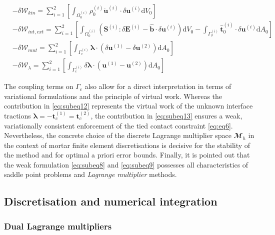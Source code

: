\documentclass[a4paper,10pt]{article} %
\begin{document}
\begin{subequations}\label{eq:constributions}
    \begin{align}
        & -\delta \mathcal{W}_{kin} = \sum_{i = 1}^2 \left[\int_{\Omega_0^{(i)}} \rho_0^{(i)} \ddot{\mathbf{u}}^{(i)} \cdot \delta \mathbf{u}^{(i)} \text{d}V_0\right] \label{eq:subeq10} \\
        & -\delta \mathcal{W}_{int,ext} = \sum_{i = 1}^2 \left[\int_{\Omega_0^{(i)}} \left(\mathbf{S}^{(i)} : \delta \mathbf{E}^{(i)} - \hat{\mathbf{b}}\cdot \delta\mathbf{u}^{(i)} \right) \text{d}V_0 - \int_{\Gamma_\sigma^{(i)}} \hat{\mathbf{t}}_0^{(i)}\cdot\delta\mathbf{u}^{(i)} \text{d}A_0 \right] \label{eq:subeq11} \\
        & -\delta \mathcal{W}_{mnt} = \sum_{i = 1}^2 \left[\int_{\Gamma_c^{(i)}} \boldsymbol{\lambda} \cdot \left(\delta \mathbf{u}^{(1)} - \delta \mathbf{u}^{(2)}\right) \text{d}A_0\right] \label{eq:subeq12} \\ 
        & -\delta \mathcal{W}_{\lambda} = \sum_{i = 1}^2 \left[\int_{\Gamma_c^{(i)}} \delta \boldsymbol{\lambda} \cdot \left( \mathbf{u}^{(1)} - \mathbf{u}^{(2)}\right) \text{d}A_0\right] \label{eq:subeq13}
    \end{align}
\end{subequations}

The coupling terms on $\Gamma_c$ also allow for a direct interpretation in terms of variational formulations and the principle of virtual work. Whereas the contribution in \eqref{eq:subeq12} represents the virtual work of the unknown interface tractions $\boldsymbol{\lambda} = −\mathbf{t}_c^{(1)} = \mathbf{t}_c^{(2)}$, the contribution in \eqref{eq:subeq13} ensures a weak, variationally consistent enforcement of the tied contact constraint \eqref{eq:eq6}. Nevertheless, the concrete choice of the discrete Lagrange multiplier space $\mathbfcal{M}_h$ in the context of mortar finite element discretisations is decisive for the stability of the method and for optimal a priori error bounds. Finally, it is pointed out that the weak formulation \eqref{eq:subeq8} and \eqref{eq:subeq9} possesses all characteristics of saddle point problems and \textit{Lagrange multiplier} methods.

\subsection{Discretisation and numerical integration}

\subsubsection{Dual Lagrange multipliers}
\end{document}
